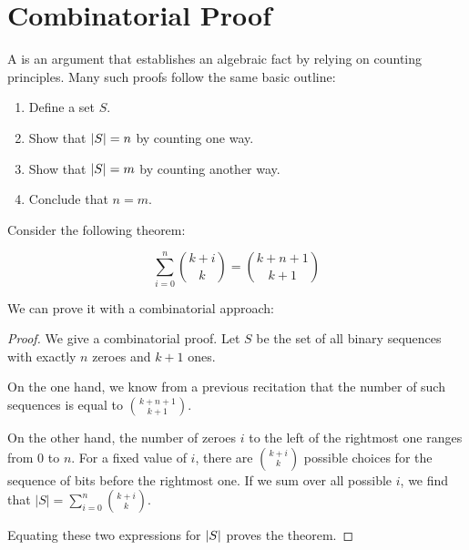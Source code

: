 \documentclass[12pt]{article}
\begin{document}


\section{Combinatorial Proof}

A  is an argument that establishes an
algebraic fact by relying on counting principles.  Many such proofs
follow the same basic outline:
%
\begin{enumerate}

\item Define a set $S$.

\item Show that $\left|S\right| = n$ by counting one way.

\item Show that $\left|S\right| = m$ by counting another way.

\item Conclude that $n = m$.

\end{enumerate}

Consider the following theorem:

\begin{theorem*}
\[
\sum_{i=0}^n \binom{k+i}{k} = \binom{k+n+1}{k+1}
\]
\end{theorem*}

We can prove it with a combinatorial approach:

\begin{proof}
We give a combinatorial proof.  Let $S$ be the set of all binary
sequences with exactly $n$ zeroes and $k + 1$ ones.

On the one hand, we know from a previous recitation that the number of
such sequences is equal to $\binom{k + n + 1}{k+1}$.

On the other hand, the number of zeroes $i$ to the left of the rightmost
one ranges from 0 to $n$.  For a fixed value of $i$, there are
$\binom{k + i}{k}$ possible choices for the sequence of bits before the
rightmost one.  If we sum over all possible $i$, we find that
$|S| = \sum_{i = 0}^n \binom{k + i}{k}$.

Equating these two expressions for $\left|S\right|$ proves the theorem.
\end{proof}


\end{document}
